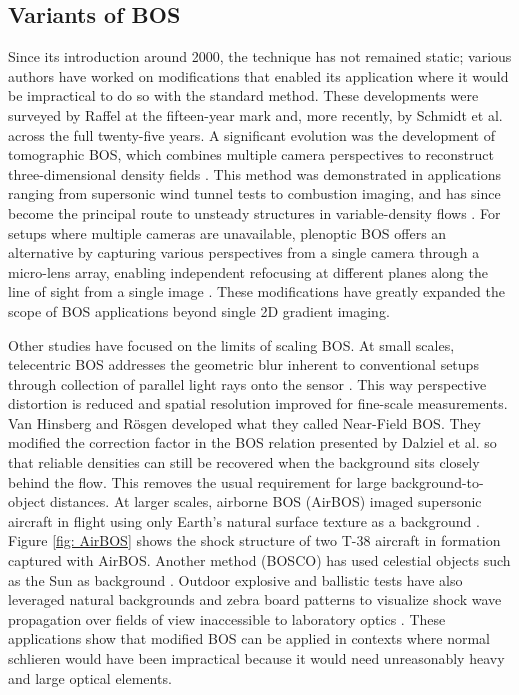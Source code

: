 \subsection{Variants of BOS}
\label{subsection: Variants of BOS}
\par Since its introduction around 2000, the technique has not remained static; various authors have worked on modifications that enabled its application where it would be impractical to do so with the standard method. These developments were surveyed by Raffel \cite{Raffel2015} at the fifteen-year mark and, more recently, by Schmidt et al. \cite{Schmidt2025} across the full twenty-five years. A significant evolution was the development of tomographic BOS, which combines multiple camera perspectives to reconstruct three-dimensional density fields \cite{TomographicBOS, Raffel2015}. This method was demonstrated in applications ranging from supersonic wind tunnel tests to combustion imaging, and has since become the principal route to unsteady structures in variable-density flows \cite{Schmidt2025}. For setups where multiple cameras are unavailable, plenoptic BOS offers an alternative by capturing various perspectives from a single camera through a micro-lens array, enabling independent refocusing at different planes along the line of sight from a single image \cite{PlenopticBOS}. These modifications have greatly expanded the scope of BOS applications beyond single 2D gradient imaging.

\par Other studies have focused on the limits of scaling BOS. At small scales, telecentric BOS addresses the geometric blur inherent to conventional setups through collection of parallel light rays onto the sensor \cite{TelecentricBOS}. This way perspective distortion is reduced and spatial resolution improved for fine-scale measurements. Van Hinsberg and Rösgen \cite{vanHinsberg2014} developed what they called Near-Field BOS. They modified the correction factor in the BOS relation presented by Dalziel et al. \cite{Dalziel2000} so that reliable densities can still be recovered when the background sits closely behind the flow. This removes the usual requirement for large background-to-object distances. At larger scales, airborne BOS (AirBOS) imaged supersonic aircraft in flight using only Earth's natural surface texture as a background \cite{AirBOS, AirBOS2}. Figure \ref{fig: AirBOS} shows the shock structure of two T-38 aircraft in formation captured with AirBOS. Another method (BOSCO) has used celestial objects such as the Sun as background \cite{BOSCO}. Outdoor explosive and ballistic tests have also leveraged natural backgrounds and zebra board patterns to visualize shock wave propagation over fields of view inaccessible to laboratory optics \cite{ExplosionsBOS, Schmidt2025}. These applications show that modified BOS can be applied in contexts where normal schlieren would have been impractical because it would need unreasonably heavy and large optical elements.

